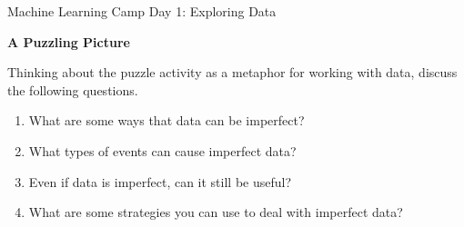 \documentclass[10pt]{article}
\newcommand{\headerclass}{Machine Learning Camp}
\newcommand{\headersection}{Day 1: Exploring Data}
\newcommand{\headertitle}{A Puzzling Picture}
\begin{document}
\headerclass\xspace {} \headersection\\
\begin{center}{ \large \textbf{\headertitle} }\end{center}

Thinking about the puzzle activity as a metaphor for working with data, discuss the following questions.

\begin{enumerate}
\item What are some ways that data can be imperfect?
\vfill
\item What types of events can cause imperfect data?
\vfill
\item Even if data is imperfect, can it still be useful?
\vfill
\item What are some strategies you can use to deal with imperfect data?
\vfill
\end{enumerate}
\end{document}

